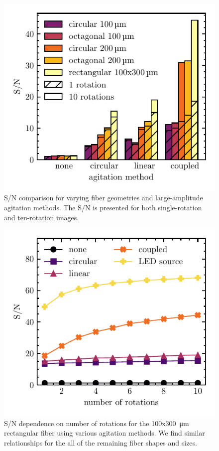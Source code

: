 \documentclass[twocolumn]{emulateapj}
\begin{document}
\begin{figure}
\centering
	\includegraphics[width=\columnwidth]{images/ag_snr.pdf}
	\caption{S/N comparison for varying fiber geometries and large-amplitude agitation methods. The S/N is presented for both single-rotation and ten-rotation images.}
\label{fig:ag_snr}
\end{figure}

\begin{figure}
\centering
	\includegraphics[width=\columnwidth]{images/rect_snr_vs_time.pdf}
	\caption{S/N dependence on number of rotations for the 100x\SI{300}{\micro\meter} rectangular fiber using various agitation methods. We find similar relationships for the all of the remaining fiber shapes and sizes.}
\label{fig:rect_snr_vs_time}
\end{figure}
\end{document}
